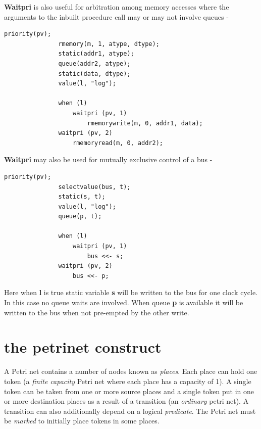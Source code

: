         {\bf Waitpri} is also useful for arbitration among memory accesses
        where the arguments to the inbuilt procedure call may or may not
        involve queues -
        \begin{lstlisting}[gobble=8, language=threepl]
               priority(pv);
               rmemory(m, 1, atype, dtype);
               static(addr1, atype);
               queue(addr2, atype);
               static(data, dtype);
               value(l, "log");
               
               when (l)
                   waitpri (pv, 1)
                       rmemorywrite(m, 0, addr1, data);
               waitpri (pv, 2)
                   rmemoryread(m, 0, addr2);
        \end{lstlisting}
        
        {\bf Waitpri} may also be used for mutually exclusive control of
        a bus -
        \begin{lstlisting}[gobble=8, language=threepl]
               priority(pv);
               selectvalue(bus, t);
               static(s, t);
               value(l, "log");
               queue(p, t);
               
               when (l)
                   waitpri (pv, 1)
                       bus <<- s;
               waitpri (pv, 2)
                   bus <<- p;
        \end{lstlisting}
        Here when {\bf l} is true static variable {\bf s} will be written to the
        bus for one clock cycle. In this case no queue waits are involved. When
        queue {\bf p} is available it will be written to the bus when not
        pre-empted by the other write.
        
        

    \section{the petrinet construct}
    
        A Petri net contains a number of nodes known as {\em places}. Each
        place can hold one token (a {\em finite capacity} Petri net where each
        place has a capacity of 1). A single token can be taken from
        one or more source places and a single token put in one or
        more destination places as a result of a transition
        (an {\em ordinary} petri net). A transition can also additionally
        depend on a logical {\em predicate}. The Petri net must be
        {\em marked} to initially place tokens in some places.
        
